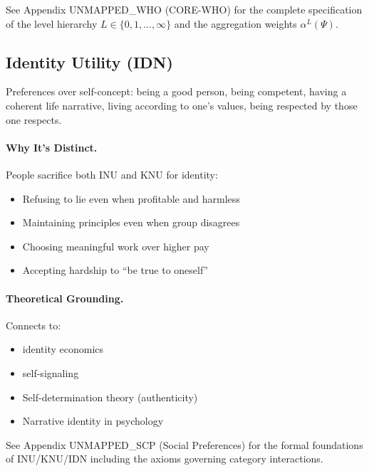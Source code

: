 \begin{cross-reference}
See Appendix UNMAPPED_WHO (CORE-WHO) for the complete specification of the level hierarchy
$L \in \{0, 1, ..., \infty\}$ and the aggregation weights $\alpha^L(\Psi)$.
\end{cross-reference}

\subsection{Identity Utility (IDN)}
\label{sec:fepsde-idn}

\begin{definition}
Preferences over self-concept: being a good person, being competent,
having a coherent life narrative, living according to one's values,
being respected by those one respects.
\end{definition}

\paragraph{Why It's Distinct.}
People sacrifice both INU and KNU for identity:
\begin{itemize}[nosep]
  \item Refusing to lie even when profitable and harmless
  \item Maintaining principles even when group disagrees
  \item Choosing meaningful work over higher pay
  \item Accepting hardship to ``be true to oneself''
\end{itemize}

\paragraph{Theoretical Grounding.}
Connects to:
\begin{itemize}[nosep]
  \item \citet{akerlofkranton} identity economics
  \item \citet{benaboutirole} self-signaling
  \item Self-determination theory (authenticity)
  \item Narrative identity in psychology
\end{itemize}

\begin{cross-reference}
See Appendix UNMAPPED_SCP (Social Preferences) for the formal foundations of
INU/KNU/IDN including the axioms governing category interactions.
\end{cross-reference}


